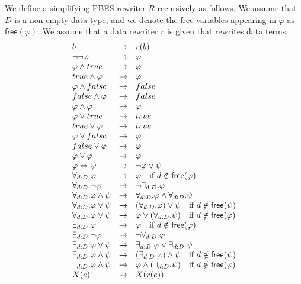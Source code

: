 \documentclass{article}
\begin{document}
We define a simplifying PBES rewriter $R$ recursively as follows. We assume
that $D$ is a non-empty data type, and we denote the free variables
appearing in $\varphi $ as $\mathsf{free}(\varphi )$. We assume that a data
rewriter $r$ is given that rewrites data terms.%
\begin{equation*}
\begin{array}{lcl}
b & \rightarrow & r(b) \\ 
\lnot \lnot \varphi & \rightarrow & \varphi \\ 
\varphi \wedge true & \rightarrow & \varphi \\ 
true\wedge \varphi & \rightarrow & \varphi \\ 
\varphi \wedge false & \rightarrow & false \\ 
false\wedge \varphi & \rightarrow & false \\ 
\varphi \wedge \varphi & \rightarrow & \varphi \\ 
\varphi \vee true & \rightarrow & true \\ 
true\vee \varphi & \rightarrow & true \\ 
\varphi \vee false & \rightarrow & \varphi \\ 
false\vee \varphi & \rightarrow & \varphi \\ 
\varphi \vee \varphi & \rightarrow & \varphi \\ 
\varphi \Rightarrow \psi & \rightarrow & \lnot \varphi \vee \psi \\ 
\forall _{d:D}.\varphi & \rightarrow & \varphi \text{ if }d\notin \mathsf{%
free}(\varphi ) \\ 
\forall _{d:D}.\lnot \varphi & \rightarrow & \lnot \exists _{d:D}.\varphi \\ 
\forall _{d:D}.\varphi \wedge \psi & \rightarrow & \forall _{d:D}.\varphi
\wedge \forall _{d:D}.\psi \\ 
\forall _{d:D}.\varphi \vee \psi & \rightarrow & (\forall _{d:D}.\varphi
)\vee \psi \text{ if }d\notin \mathsf{free}(\psi ) \\ 
\forall _{d:D}.\varphi \vee \psi & \rightarrow & \varphi \vee (\forall
_{d:D}.\psi )\text{ if }d\notin \mathsf{free}(\varphi ) \\ 
\exists _{d:D}.\varphi & \rightarrow & \varphi \text{ if }d\notin \mathsf{%
free}(\varphi ) \\ 
\exists _{d:D}.\lnot \varphi & \rightarrow & \lnot \forall _{d:D}.\varphi \\ 
\exists _{d:D}.\varphi \vee \psi & \rightarrow & \exists _{d:D}.\varphi \vee
\exists _{d:D}.\psi \\ 
\exists _{d:D}.\varphi \wedge \psi & \rightarrow & (\exists _{d:D}.\varphi
)\wedge \psi \text{ if }d\notin \mathsf{free}(\psi ) \\ 
\exists _{d:D}.\varphi \wedge \psi & \rightarrow & \varphi \wedge (\exists
_{d:D}.\psi )\text{ if }d\notin \mathsf{free}(\varphi ) \\ 
X(e) & \rightarrow & X(r(e))%
\end{array}%
\end{equation*}%
\end{document}
